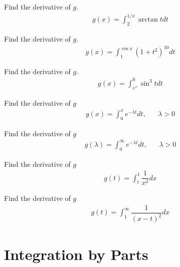 \begin{exercise}
Find the derivative of $g$.
\begin{align*}
    g(x) = \int_{2}^{1/x} \arctan t dt
\end{align*}
\end{exercise}

\begin{exercise}
Find the derivative of $g$.
\begin{align*}
    g(x) = \int_{1}^{\cos x} (1 + t^{2})^{10} dt
\end{align*}
\end{exercise}

\begin{exercise}
Find the derivative of $g$.
\begin{align*}
    g(x) = \int_{e^{x}}^{0} \sin^{3} t dt
\end{align*}
\end{exercise}

\begin{exercise}
Find the derivative of $g$
\begin{align*}
    g(x) = \int_{0}^{x} e^{-\lambda t} dt, \hspace{20pt} \lambda > 0
\end{align*}
\end{exercise}

\begin{exercise}
Find the derivative of $g$
\begin{align*}
    g(\lambda) = \int_{0}^{\infty} e^{-\lambda t} dt, \hspace{20pt} \lambda > 0
\end{align*}
\end{exercise}

\begin{exercise}
Find the derivative of $g$
\begin{align*}
    g(t) = \int_{t}^{1} \dfrac{1}{x^{2}} dx
\end{align*}
\end{exercise}

\begin{exercise}
Find the derivative of $g$
\begin{align*}
    g(t) = \int_{1}^{\infty} \dfrac{1}{(x-t)^{2}} dx
\end{align*}
\end{exercise}

\newpage
\section{Integration by Parts}

